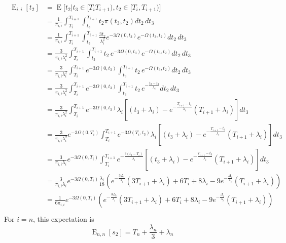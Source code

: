 \documentclass{article}
\DeclareMathOperator{\E}{E}
\begin{document}
\begin{align}
    \begin{split}
        \E_{i,i}[t_2] &= \E\big[t_2|t_3 \in [T_i T_{i+1}),t_2 \in [T_i,T_{i+1}) \big]\\
                      &= \frac{1}{\pi_{i,i}}\int_{T_i}^{T_{i+1}}\int_{t_3}^{T_{i+1}}t_2\pi(t_3,t_2)dt_2\,dt_3\\
                      &= \frac{1}{\pi_{i,i}}\int_{T_i}^{T_{i+1}}\int_{t_3}^{T_{i+1}}
                        \frac{3t_2}{\lambda_i^2}e^{-3\Omega(0,t_3)}e^{-\Omega(t_3,t_2)}dt_2\,dt_3\\
                      &= \frac{3}{\pi_{i,i}\lambda_i^2}\int_{T_i}^{T_{i+1}}\int_{t_3}^{T_{i+1}}
                        t_2\,e^{-3\Omega(0,t_3)}e^{-\Omega(t_3,t_2)}dt_2\,dt_3\\
                      &= \frac{3}{\pi_{i,i}\lambda_i^2}\int_{T_i}^{T_{i+1}}
                        e^{-3\Omega(0,t_3)}\int_{t_3}^{T_{i+1}}t_2\,e^{-\Omega(t_3,t_2)}dt_2\,dt_3\\
                      &= \frac{3}{\pi_{i,i}\lambda_i^2}\int_{T_i}^{T_{i+1}}
                        e^{-3\Omega(0,t_3)}\int_{t_3}^{T_{i+1}}t_2\,e^{-\frac{t_2-t_3}{\lambda_i}}dt_2\,dt_3\\
                      &= \frac{3}{\pi_{i,i}\lambda_i^2}\int_{T_i}^{T_{i+1}}
                        e^{-3\Omega(0,t_3)}\lambda_i\left[(t_3+\lambda_i)-e^{-\frac{T_{i+1}-t_3}{\lambda_i}}(T_{i+1}+\lambda_i)\right]dt_3\\
                        &= \frac{3}{\pi_{i,i}\lambda_i^2}e^{-3\Omega(0,T_i)}\int_{T_i}^{T_{i+1}}
                        e^{-3\Omega(T_i,t_3)}\lambda_i\left[(t_3+\lambda_i)-e^{-\frac{T_{i+1}-t_3}{\lambda_i}}(T_{i+1}+\lambda_i)\right]dt_3\\
                        &= \frac{3}{\pi_{i,i}\lambda_i}e^{-3\Omega(0,T_i)}\int_{T_i}^{T_{i+1}}
                    e^{-\frac{3(t_3-T_i)}{\lambda_i}}\left[(t_3+\lambda_i)-e^{-\frac{T_{i+1}-t_3}{\lambda_i}}(T_{i+1}+\lambda_i)\right]dt_3\\
                        &= \frac{3}{\pi_{i,i}\lambda_i}e^{-3\Omega(0,T_i)}
                                \frac{\lambda_i}{18}\left(e^{-\frac{3\Delta_i}{\lambda_i}}(3T_{i+1}+\lambda_i)
                                + 6T_i + 8\lambda_i - 9e^{-\frac{\Delta_i}{\lambda_i}}(T_{i+1}+\lambda_i)\right)\\
                        &= \frac{1}{6\pi_{i,i}}e^{-3\Omega(0,T_i)}
                                \left(e^{-\frac{3\Delta_i}{\lambda_i}}(3T_{i+1}+\lambda_i)
                                + 6T_i + 8\lambda_i - 9e^{-\frac{\Delta_i}{\lambda_i}}(T_{i+1}+\lambda_i)\right)
                    \\
    \end{split}
\end{align}
For $i=n$, this expectation is 
\begin{equation}
    \E_{n,n}[s_2] = T_n+\frac{\lambda_n}{3}+\lambda_n
\end{equation}
\end{document}
